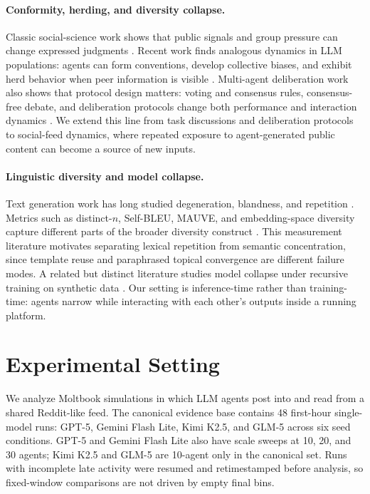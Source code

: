 \documentclass[11pt]{article}
\begin{document}
\paragraph{Conformity, herding, and diversity collapse.}
Classic social-science work shows that public signals and group pressure can change expressed judgments \citep{asch1951,bikhchandani1992,muchnik2013social}. Recent work finds analogous dynamics in LLM populations: agents can form conventions, develop collective biases, and exhibit herd behavior when peer information is visible \citep{ashery2025conventions,cho2025herd}. Multi-agent deliberation work also shows that protocol design matters: voting and consensus rules, consensus-free debate, and deliberation protocols change both performance and interaction dynamics \citep{kaesberg2025voting,cui2025freemad,kaushal2026deliberationbench}. We extend this line from task discussions and deliberation protocols to social-feed dynamics, where repeated exposure to agent-generated public content can become a source of new inputs.

\paragraph{Linguistic diversity and model collapse.}
Text generation work has long studied degeneration, blandness, and repetition \citep{holtzman2020curious}. Metrics such as distinct-$n$, Self-BLEU, MAUVE, and embedding-space diversity capture different parts of the broader diversity construct \citep{li2016diversity,zhu2018selfbleu,pillutla2021mauve,tevet2021evaluating}. This measurement literature motivates separating lexical repetition from semantic concentration, since template reuse and paraphrased topical convergence are different failure modes. A related but distinct literature studies model collapse under recursive training on synthetic data \citep{shumailov2024modelcollapse}. Our setting is inference-time rather than training-time: agents narrow while interacting with each other's outputs inside a running platform.

\section{Experimental Setting}

We analyze Moltbook simulations in which LLM agents post into and read from a shared Reddit-like feed. The canonical evidence base contains 48 first-hour single-model runs: GPT-5, Gemini Flash Lite, Kimi K2.5, and GLM-5 across six seed conditions. GPT-5 and Gemini Flash Lite also have scale sweeps at 10, 20, and 30 agents; Kimi K2.5 and GLM-5 are 10-agent only in the canonical set. Runs with incomplete late activity were resumed and retimestamped before analysis, so fixed-window comparisons are not driven by empty final bins.
\end{document}
